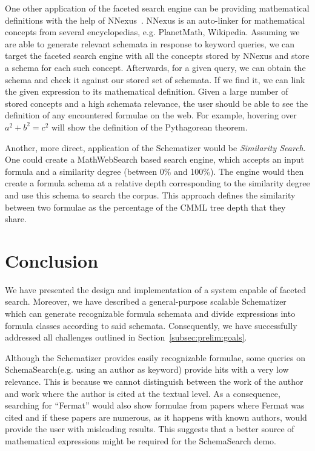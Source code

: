 \documentclass[a4paper,oneside]{article}
\def\schemasearch{\textsf{SchemaSearch}\xspace}
\def\mws{\textsf{MathWebSearch}\xspace}
\begin{document}
One other application of the faceted search engine can be providing
mathematical definitions with the help of
\textsf{NNexus}~\cite{GinCor:nnexus:14}. NNexus is an auto-linker for
mathematical concepts from several encyclopedias, e.g.  PlanetMath, Wikipedia.
Assuming we are able to generate relevant schemata in response to keyword
queries, we can target the faceted search engine with all the concepts stored
by NNexus and store a schema for each such concept.  Afterwards, for a given
query, we can obtain the schema and check it against our stored set of
schemata. If we find it, we can link the given expression to its mathematical
definition. Given a large number of stored concepts and a high schemata
relevance, the user should be able to see the definition of any encountered
formulae on the web. For example, hovering over $a^2 + b^2 = c^2$ will show the
definition of the Pythagorean theorem.

Another, more direct, application of the Schematizer would be
\textit{Similarity Search}. One could create a \mws based search engine, which
accepts an input formula and a similarity degree (between 0\% and 100\%). The
engine would then create a formula schema at a relative depth corresponding to
the similarity degree and use this schema to search the corpus. This approach
defines the similarity between two formulae as the percentage of the CMML tree
depth that they share.

\section{Conclusion}\label{sec:conclusion}
We have presented the design and implementation of a system capable of faceted
search. Moreover, we have described a general-purpose scalable Schematizer
which can generate recognizable formula schemata and divide expressions into
formula classes according to said schemata. Consequently, we have successfully
addressed all challenges outlined in Section~\ref{subsec:prelim:goals}.

Although the Schematizer provides easily recognizable formulae, some queries on
\schemasearch (e.g. using an author as keyword) provide hits with a very low
relevance. This is because we cannot distinguish between the work of the author
and work where the author is cited at the textual level. As a consequence,
searching for ``Fermat'' would also show formulae from papers where Fermat was
cited and if these papers are numerous, as it happens with known authors, would
provide the user with misleading results. This suggests that a better source of
mathematical expressions might be required for the SchemaSearch demo.

\printbibliography
\end{document}
